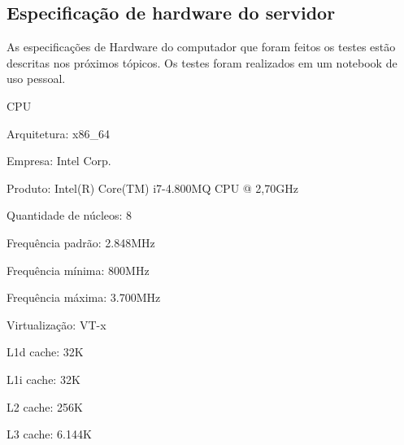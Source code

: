 \begin{anexosenv}

    \partanexos

    \chapter{Especificação de hardware do servidor}

        As especificações de Hardware
        do computador que foram feitos os testes estão descritas nos próximos tópicos.
        Os testes foram realizados em um notebook de uso pessoal.

        \begin{alineas}

        \item CPU

        \begin{alineas}

            \item Arquitetura: x86\_64

            \item Empresa: Intel Corp.

            \item Produto: Intel(R) Core(TM) i7-4.800MQ CPU @ 2,70GHz

            \item Quantidade de núcleos: 8

            \item Frequência padrão: 2.848MHz

            \item Frequência mínima:  800MHz

            \item Frequência máxima: 3.700MHz

            \item Virtualização: VT-x

            \item L1d cache: 32K

            \item L1i cache: 32K

            \item L2 cache: 256K

            \item L3 cache: 6.144K

        \end{alineas}


\end{alineas}
\end{anexosenv}
